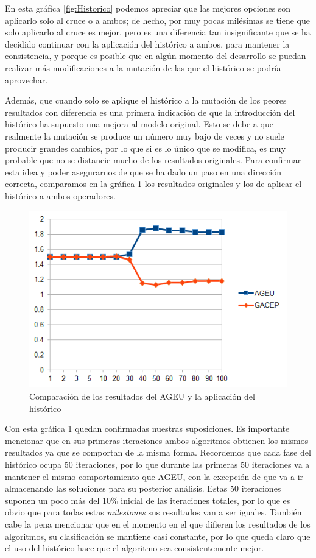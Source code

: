 En esta gráfica \ref{fig:Historico} podemos apreciar que las mejores opciones son aplicarlo solo al cruce o a ambos; de hecho, por muy pocas milésimas se tiene que solo aplicarlo al cruce es mejor, pero es una diferencia tan insignificante que se ha decidido continuar con la aplicación del histórico a ambos, para mantener la consistencia, y porque es posible que en algún momento del desarrollo se puedan realizar más modificaciones a la mutación de las que el histórico se podría aprovechar. 

Además, que cuando solo se aplique el histórico a la mutación de los peores resultados con diferencia es una primera indicación de que la introducción del histórico ha supuesto una mejora al modelo original.
Esto se debe a que realmente la mutación se produce un número muy bajo de veces y no suele producir grandes cambios, por lo que si es lo único que se modifica, es muy probable que no se distancie mucho de los resultados originales. 
Para confirmar esta idea y poder asegurarnos de que se ha dado un paso en una dirección correcta, comparamos en la gráfica \ref{fig:AGEUvsGACEP} los resultados originales y los de aplicar el histórico a ambos operadores. 

\begin{figure}[h]
		\centering
		\includegraphics[scale=1]{imagenes/Experimental/AGEUvsGACEP.png}
        \caption{Comparación de los resultados del AGEU y la aplicación del histórico}
        \label{fig:AGEUvsGACEP}
\end{figure}

Con esta gráfica \ref{fig:AGEUvsGACEP} quedan confirmadas nuestras suposiciones. 
Es importante mencionar que en sus primeras iteraciones ambos algoritmos obtienen los mismos resultados ya que se comportan de la misma forma. 
Recordemos que cada fase del histórico ocupa 50 iteraciones, por lo que durante las primeras 50 iteraciones va a mantener el mismo comportamiento que AGEU, con la excepción de que va a ir almacenando las soluciones para su posterior análisis. 
Estas 50 iteraciones suponen un poco más del 10\% inicial de las iteraciones totales, por lo que es obvio que para todas estas \textit{milestones} sus resultados van a ser iguales. 
También cabe la pena mencionar que en el momento en el que difieren los resultados de los algoritmos, su clasificación se mantiene casi constante, por lo que queda claro que el uso del histórico hace que el algoritmo sea consistentemente mejor.  


